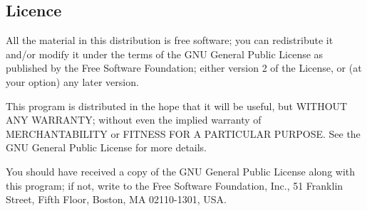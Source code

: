 \subsection{Licence}
All the material in this distribution is free software; you can
redistribute it and/or 
modify it under the terms of the GNU General Public License
as published by the Free Software Foundation; either version 2
of the License, or (at your option) any later version.

This program is distributed in the hope that it will be useful,
but WITHOUT ANY WARRANTY; without even the implied warranty of
MERCHANTABILITY or FITNESS FOR A PARTICULAR PURPOSE.  See the
GNU General Public License for more details.

You should have received a copy of the GNU General Public License
along with this program; if not, write to the Free Software
Foundation, Inc., 51 Franklin Street, Fifth Floor, Boston, MA  02110-1301, USA.


 
